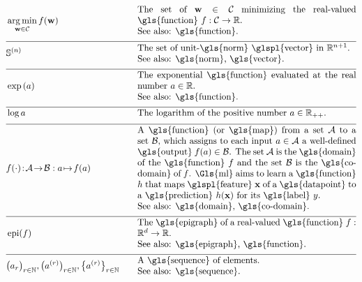 \newpage
\begin{align}
    	&\argmin_{\weights \in \mathcal{C}} f(\weights) &\quad &\parbox{.70\textwidth}{The set of $\weights \in \mathcal{C}$ 
		minimizing the real-valued \gls{function} $f: \mathcal{C} \rightarrow \mathbb{R}$. 
    		\\ See also: \gls{function}. } \nonumber \\[2mm] \hline \nonumber\\[-5mm]
    	&\sphere{\nrnodes} &\quad &\parbox{.70\textwidth}{The set of unit-\gls{norm} \glspl{vector} in $\mathbb{R}^{\nrnodes+1}$.
    		\\ See also: \gls{norm}, \gls{vector}. }\nonumber \\[2mm] \hline \nonumber\\[-5mm]
	&\exp\,(a) &\quad &\parbox{.70\textwidth}{The exponential \gls{function} evaluated at the real number $a \in \mathbb{R}$.
		\\ See also: \gls{function}. } \nonumber \\[2mm] \hline \nonumber\\[-5mm] %
	&\log a &\quad &\mbox{The logarithm of the positive number $a \in \mathbb{R}_{++}$.  } \nonumber \\[2mm] \hline \nonumber\\[-5mm] %
	&f(\cdot)\!:\!\mathcal{A}\!\rightarrow\!\mathcal{B} :  a \!\mapsto\!f(a) &\quad &\parbox{.70\textwidth}{
	 	A \gls{function} (or \gls{map}) from a set $\mathcal{A}$ to a set $\mathcal{B}$, which assigns to each input 
	 	$a \in \mathcal{A}$ a well-defined \gls{output} $f(a) \in \mathcal{B}$.
	 	The set $\mathcal{A}$ is the \gls{domain} of the \gls{function} $f$ and the set $\mathcal{B}$ is the 
	 	\gls{co-domain} of $f$. \Gls{ml} aims to learn a \gls{function} $\hypothesis$ that maps \glspl{feature} 
	 	$\featurevec$ of a \gls{datapoint} to a \gls{prediction} $\hypothesis(\featurevec)$ for its \gls{label} $\truelabel$.
		\\ See also: \gls{domain}, \gls{co-domain}.} \nonumber \\[2mm] \hline \nonumber\\[-5mm]
	&\operatorname{epi}(f)  & \quad & \parbox{.70\textwidth}{The \gls{epigraph} of a real-valued \gls{function} 
	 	$f: \mathbb{R}^{\featuredim}\rightarrow \mathbb{R}$.
		\\ See also: \gls{epigraph}, \gls{function}. } \nonumber \\[2mm]  \hline \nonumber\\[-5mm]
	&\big( a_{\sampleidx} \big)_{\sampleidx \in \mathbb{N}},
		\big( a^{(\sampleidx)} \big)_{\sampleidx \in \mathbb{N}},\big\{ a^{(\sampleidx)} \big\}_{\sampleidx \in \mathbb{N}} 
		& \quad & \parbox{.70\textwidth}{A \gls{sequence} of elements.
		\\ See also: \gls{sequence}. } \nonumber 
\end{align} 

